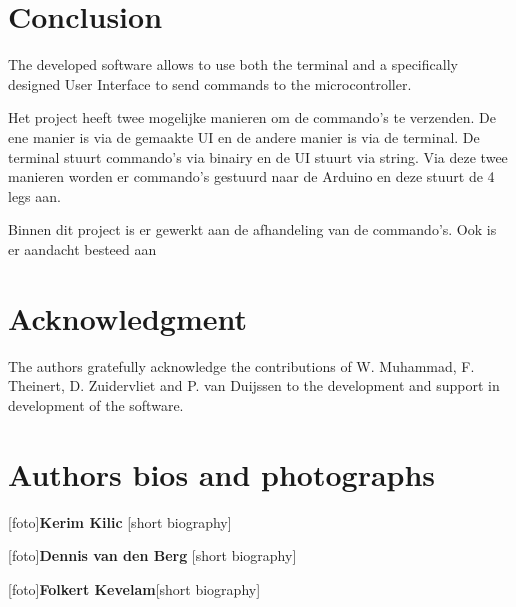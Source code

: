 \documentclass[conference]{IEEEtran}
\begin{document}
\section{Conclusion}
The developed software allows to use both the terminal and a specifically designed User Interface to send commands to the microcontroller.

Het project heeft twee mogelijke manieren om de commando's te verzenden. De ene manier is via de gemaakte UI en de andere manier is via de terminal. De terminal stuurt commando's via binairy en de UI stuurt via string. Via deze twee manieren worden er commando's gestuurd naar de Arduino en deze stuurt de 4 legs aan. 

Binnen dit project is er gewerkt aan de afhandeling van de commando's. Ook is er aandacht besteed aan 



\section*{Acknowledgment}
The authors gratefully acknowledge the contributions of W. Muhammad, F. Theinert, D. Zuidervliet and P. van Duijssen to the development and support in development of the software.







\section{Authors bios and photographs}

[foto]\textbf{Kerim Kilic} [short biography]

[foto]\textbf{Dennis van den Berg} [short biography]

[foto]\textbf{Folkert Kevelam}[short biography]
\end{document}
